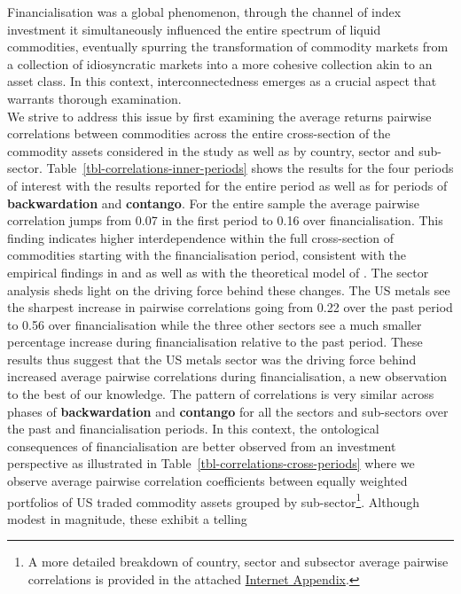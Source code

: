 \documentclass[
  authoryear,
  preprint,
  3p]{elsarticle}
\begin{document}
\medskip

Financialisation was a global phenomenon, through the channel of index
investment it simultaneously influenced the entire spectrum of liquid
commodities, eventually spurring the transformation of commodity markets
from a collection of idiosyncratic markets into a more cohesive
collection akin to an asset class. In this context, interconnectedness
emerges as a crucial aspect that warrants thorough examination.\\
We strive to address this issue by first examining the average returns
pairwise correlations between commodities across the entire
cross-section of the commodity assets considered in the study as well as
by country, sector and sub-sector.
Table~\ref{tbl-correlations-inner-periods} shows the results for the
four periods of interest with the results reported for the entire period
as well as for periods of \textbf{backwardation} and \textbf{contango}.
For the entire sample the average pairwise correlation jumps from 0.07
in the first period to 0.16 over financialisation. This finding
indicates higher interdependence within the full cross-section of
commodities starting with the financialisation period, consistent with
the empirical findings in \citet{fryMcKibbin_evolution_2023} and
\citet{mayer_financialization_2017} as well as with the theoretical
model of \citet{basak_model_2016}. The sector analysis sheds light on
the driving force behind these changes. The US metals see the sharpest
increase in pairwise correlations going from 0.22 over the past period
to 0.56 over financialisation while the three other sectors see a much
smaller percentage increase during financialisation relative to the past
period. These results thus suggest that the US metals sector was the
driving force behind increased average pairwise correlations during
financialisation, a new observation to the best of our knowledge. The
pattern of correlations is very similar across phases of
\textbf{backwardation} and \textbf{contango} for all the sectors and
sub-sectors over the past and financialisation periods. In this context,
the ontological consequences of financialisation are better observed
from an investment perspective as illustrated in
Table~\ref{tbl-correlations-cross-periods} where we observe average
pairwise correlation coefficients between equally weighted portfolios of
US traded commodity assets grouped by sub-sector\footnote{A more
  detailed breakdown of country, sector and subsector average pairwise
  correlations is provided in the attached
  \href{http://bautheac.duckdns.org:3838/bautheac/revision-jfm/}{Internet
  Appendix}.}. Although modest in magnitude, these exhibit a telling
\end{document}
